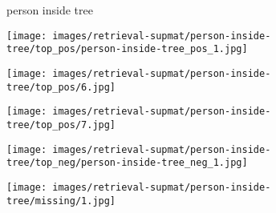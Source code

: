 \documentclass[10pt,twocolumn,letterpaper]{article}
\begin{document}
\begin{figure*}[t]
   
	\begin{minipage}[b]{0.005\textwidth}
    	\centering
    	\begin{turn}{90}
    \small{{\color{blue}person} inside {\color{red}tree}}
    	\end{turn}	
    \vspace{-1.5ex}
    \end{minipage}
    \hspace{0.01\textwidth}
    \begin{minipage}[t]{0.18\textwidth}
    	\centering
    		\texttt{[image: images/retrieval-supmat/person-inside-tree/top\_pos/person-inside-tree\_pos\_1.jpg]}\\
       	\vspace{1.5ex}
    \end{minipage}
    \hspace{0.005\textwidth}  
    \begin{minipage}[t]{0.18\textwidth}
    	\centering
       	\texttt{[image: images/retrieval-supmat/person-inside-tree/top\_pos/6.jpg]}\\
       	\vspace{1.5ex}
    \end{minipage}
    \hspace{0.005\textwidth}
    \begin{minipage}[t]{0.18\textwidth}
       \centering
       \texttt{[image: images/retrieval-supmat/person-inside-tree/top\_pos/7.jpg]}\\
       \vspace{1.5ex}
    \end{minipage}
    \hspace{0.005\textwidth}
    \begin{minipage}[t]{0.18\textwidth}
    	\centering
       	\texttt{[image: images/retrieval-supmat/person-inside-tree/top\_neg/person-inside-tree\_neg\_1.jpg]}\\
      	\vspace{1.5ex}
    \end{minipage} 
    \hspace{0.005\textwidth}
    \begin{minipage}[t]{0.18\textwidth}
    	\centering
       	\texttt{[image: images/retrieval-supmat/person-inside-tree/missing/1.jpg]}\\
       	\vspace{1.5ex}
    \end{minipage}
       

\end{figure*}
\end{document}
